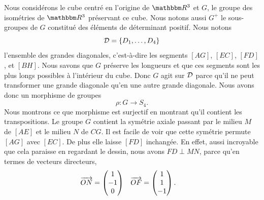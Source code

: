 \begin{figure}
   \vspace{-0.5cm}        %
   \centering
   
\end{figure}
Nous considérons le cube centré en l'origine de \( \eR^3\) et \( G\), le groupe des isométries de \( \eR^3\) préservant ce cube. Nous notons aussi \( G^+\) le sous-groupes de \( G\) constitué des éléments de déterminant positif. Nous notons
\begin{equation}
    \mathcal{D}=\{ D_1,\ldots, D_4 \}
\end{equation}
l'ensemble des grandes diagonales, c'est-à-dire les segments \( [AG]\), \( [EC]\), \( [FD]\), et \( [BH]\). Nous savons que \( G\) préserve les longueurs et que ces segments sont les plus longs possibles à l'intérieur du cube. Donc \( G\) agit sur \( \mathcal{D}\) parce qu'il ne peut transformer une grande diagonale qu'en une autre grande diagonale. Nous avons donc un morphisme de groupes
\begin{equation}
    \rho\colon G\to S_4.
\end{equation}
Nous montrons ce que morphisme est surjectif en montrant qu'il contient les transpositions. Le groupe \( G\) contient la symétrie axiale passant par le milieu \( M\) de \( [AE]\) et le milieu \( N\) de \( CG\). Il est facile de voir que cette symétrie permute \( [AG]\) avec \( [EC]\). De plus elle laisse \( [FD]\) inchangée. En effet, aussi incroyable que cela paraisse en regardant le dessin, nous avons \( FD\perp MN\), parce qu'en termes de vecteurs directeurs,
\begin{equation}
    \begin{aligned}[]
        \vect{ ON }&=\begin{pmatrix}
            1    \\
            -1    \\
            0
        \end{pmatrix}&\vect{ OF }&=\begin{pmatrix}
            1    \\
            1    \\
            -1
        \end{pmatrix}.
    \end{aligned}
\end{equation}


